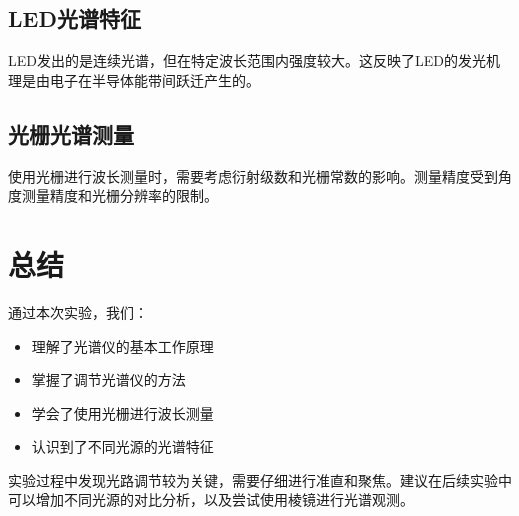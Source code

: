 \documentclass{ctexart}
\begin{document}
\subsection{LED光谱特征}
LED发出的是连续光谱，但在特定波长范围内强度较大。这反映了LED的发光机理是由电子在半导体能带间跃迁产生的。

\subsection{光栅光谱测量}
使用光栅进行波长测量时，需要考虑衍射级数和光栅常数的影响。测量精度受到角度测量精度和光栅分辨率的限制。

\section{总结}

通过本次实验，我们：
\begin{itemize}
    \item 理解了光谱仪的基本工作原理
    \item 掌握了调节光谱仪的方法
    \item 学会了使用光栅进行波长测量
    \item 认识到了不同光源的光谱特征
\end{itemize}

实验过程中发现光路调节较为关键，需要仔细进行准直和聚焦。建议在后续实验中可以增加不同光源的对比分析，以及尝试使用棱镜进行光谱观测。
\end{document}
